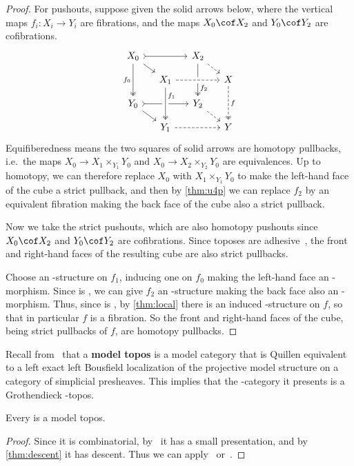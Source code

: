 \begin{proof}
  For pushouts, suppose given the solid arrows below, where the vertical maps $f_i:X_i\to Y_i$ are fibrations, and the maps $X_0\cof X_2$ and $Y_0\cof Y_2$ are cofibrations.
  \[ \begin{tikzcd}[row sep=small,column sep=small]
      X_0 \arrow[rr, tail] \arrow[dd, two heads,"f_0"'] \arrow[rd] &  & X_2 \arrow[dd, two heads,near end,"f_2"] \arrow[rd, dashed] &  \\
      & X_1 \arrow[rr, dashed, crossing over]  &  & X \arrow[dd, two heads, dashed,"f"] \\
      Y_0 \arrow[rr, tail] \arrow[rd] &  & Y_2 \arrow[rd, dashed] &  \\
      & Y_1 \arrow[rr, dashed] \arrow[from=uu,crossing over, two heads,near start,"f_1"] &  & Y
    \end{tikzcd}
  \]
  Equifiberedness means the two squares of solid arrows are homotopy pullbacks, i.e.\ the maps $X_0 \to X_1\times_{Y_1} Y_0$ and $X_0 \to X_2\times_{Y_2} Y_0$ are equivalences.
  Up to homotopy, we can therefore replace $X_0$ with $X_1\times_{Y_1} Y_0$ to make the left-hand face of the cube a strict pullback, and then by \cref{thm:u4p} we can replace $f_2$ by an equivalent fibration making the back face of the cube also a strict pullback.

  Now we take the strict pushouts, which are also homotopy pushouts since $X_0\cof X_2$ and $Y_0\cof Y_2$ are cofibrations.
  Since toposes are adhesive~\cite{ls:topadh}, the front and right-hand faces of the resulting cube are also strict pullbacks.

  Choose an \F-structure on $f_1$, inducing one on $f_0$ making the left-hand face an \F-morphism.
  Since \F is \stratified, we can give $f_2$ an \F-structure making the back face also an \F-morphism.
  Thus, since \F is \local, by \cref{thm:local} there is an induced \F-structure on $f$, so that in particular $f$ is a fibration.
  So the front and right-hand faces of the cube, being strict pullbacks of $f$, are homotopy pullbacks.
\end{proof}

Recall from~\cite{rezk:homotopy-toposes} that a \textbf{model topos} is a model category that is Quillen equivalent to a left exact left Bousfield localization of the projective model structure on a category of simplicial presheaves.
This implies that the \io-category it presents is a Grothendieck \io-topos.

\begin{cor}\label{thm:ttmt-mt}
  Every \ttmt is a model topos.
\end{cor}
\begin{proof}
  Since it is combinatorial, by~\cite{dug:pres} it has a small presentation, and by \cref{thm:descent} it has descent.
  Thus we can apply~\cite[Theorem 6.9]{rezk:homotopy-toposes} or~\cite[Theorem 6.1.0.6]{lurie:higher-topoi}.
\end{proof}

